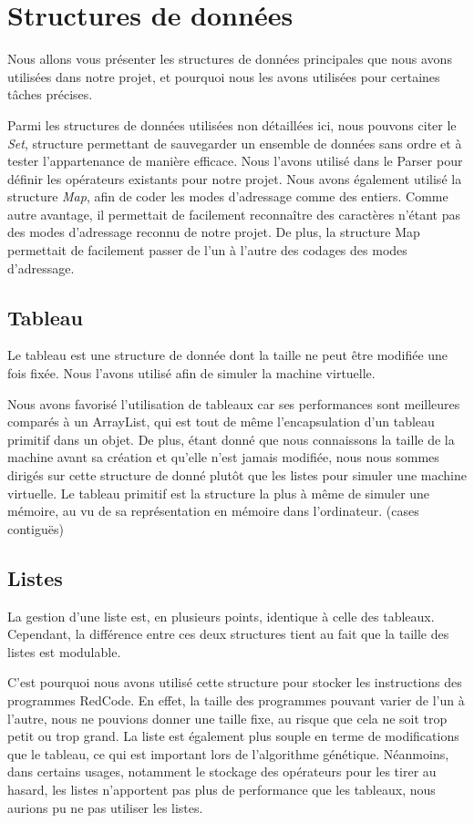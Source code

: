 \documentclass[hidelinks]{report}
\begin{document}
\section{Structures de données}
Nous allons vous présenter les structures de données principales que nous avons utilisées dans notre projet, et pourquoi nous les avons utilisées pour certaines tâches précises.

Parmi les structures de données utilisées non détaillées ici, nous pouvons citer le \emph{Set}, structure permettant de sauvegarder un ensemble de données sans ordre et à tester l'appartenance de manière efficace. Nous l'avons utilisé dans le Parser pour définir les opérateurs existants pour notre projet. Nous avons également utilisé la structure \emph{Map}, afin de coder les modes d'adressage comme des entiers. Comme autre avantage, il permettait de facilement reconnaître des caractères n'étant pas des modes d'adressage reconnu de notre projet. De plus, la structure Map permettait de facilement passer de l'un à l'autre des codages des modes d'adressage.
\subsection{Tableau}
Le tableau est une structure de donnée dont la taille ne peut être modifiée une fois fixée. Nous l'avons utilisé afin de simuler la machine virtuelle.

Nous avons favorisé l'utilisation de tableaux car ses performances sont meilleures comparés à un ArrayList, qui est tout de même l'encapsulation d'un tableau primitif dans un objet. De plus, étant donné que nous connaissons la taille de la machine avant sa création et qu'elle n'est jamais modifiée, nous nous sommes dirigés sur cette structure de donné plutôt que les listes pour simuler une machine virtuelle. Le tableau primitif est la structure la plus à même de simuler une mémoire, au vu de sa représentation en mémoire dans l'ordinateur. (cases contiguës)
\subsection{Listes}
La gestion d'une liste est, en plusieurs points, identique à celle des tableaux. Cependant, la différence entre ces deux structures tient au fait que la taille des listes est modulable.

C'est pourquoi nous avons utilisé cette structure pour stocker les instructions des programmes RedCode. En effet, la taille des programmes pouvant varier de l'un à l'autre, nous ne pouvions donner une taille fixe, au risque que cela ne soit trop petit ou trop grand. La liste est également plus souple en terme de modifications que le tableau, ce qui est important lors de l'algorithme génétique. Néanmoins, dans certains usages, notamment le stockage des opérateurs pour les tirer au hasard, les listes n'apportent pas plus de performance que les tableaux, nous aurions pu ne pas utiliser les listes.
\end{document}

